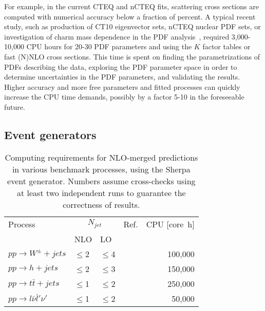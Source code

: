 For example, in the current CTEQ and nCTEQ fits, scattering cross
sections are computed with numerical accuracy below a fraction of
percent. A typical recent study, such as production of
CT10 eigenvector sets, nCTEQ nuclear PDF sets, or investigation 
of charm mass dependence in the PDF analysis~\cite{Gao:2013wwa,
 Gao:2013xoa,Schienbein:2009kk}, required  3,000-10,000 CPU hours 
for 20-30 PDF parameters and using the $K$ factor
tables or fast (N)NLO cross sections. This time is spent on finding
the parametrizations of PDFs describing the data,
exploring the PDF parameter space in order to determine uncertainties
in the PDF parameters, and validating the results. Higher accuracy and
more free parameters and fitted processes can quickly increase the
CPU time demands, possibly by a factor 5-10 in the foreseeable future.

\subsection{Event generators}

\begin{table}
  \centering
  \begin{tabular}{llllr}
    \hline
    Process & \multicolumn{2}{c}{$N_{jet}$} & Ref. & CPU [core~h] \\
    & NLO & LO & & \\
    \hline\hline
    $pp\to W^\pm+jets$ & $\le$2 & $\le$4 & \cite{Hoeche:2012yf} & 100,000 \\
    $pp\to h+jets$ & $\le$2 & $\le$3 & \cite{Hoeche:2013xxx} & 150,000 \\
    $pp\to t\bar{t}+jets$ & $\le$1 & $\le$2 & \cite{Hoeche:2013mua} & 250,000 \\
    $pp\to l\bar{\nu}\bar{l}'\nu'$ & $\le$1 & $\le$2 & \cite{Cascioli:2013xxx} & 50,000 \\
    \hline
  \end{tabular}
  \caption{Computing requirements for NLO-merged predictions in
    various benchmark processes, using the Sherpa event generator.
    Numbers assume cross-checks using at least two independent runs
    to guarantee the correctness of results.
    \label{tab:nlo_merging}}
\end{table}

